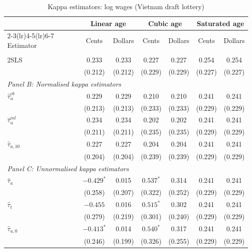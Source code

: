 \documentclass[12pt, a4paper, oneside]{article}
\theoremstyle{plain}
\theoremstyle{definition}
\begin{document}
\begin{table}[htbp]
\centering
\caption{Kappa estimators: log wages (Vietnam draft lottery)}
\label{tab:vietnam_kappa}
\small
\begin{tabular}{l cc cc cc}
\toprule
 & \multicolumn{2}{c}{Linear age}
 & \multicolumn{2}{c}{Cubic age}
 & \multicolumn{2}{c}{Saturated age} \\
\cmidrule(lr){2-3}\cmidrule(lr){4-5}\cmidrule(lr){6-7}
Estimator & Cents & Dollars & Cents & Dollars & Cents & Dollars \\
\midrule
\addlinespace[2pt]
\multicolumn{7}{l}{\textit{Panel A: 2SLS benchmark}} \\[2pt]
2SLS
  & 0.233      & 0.233
  & 0.227      & 0.227
  & 0.254      & 0.254      \\
  & (0.212)    & (0.212)
  & (0.229)    & (0.229)
  & (0.227)    & (0.227)    \\[4pt]
 
\multicolumn{7}{l}{\textit{Panel B: Normalised kappa estimators}} \\[2pt]
$\hat{\tau}_{u}^{cb}$
  & 0.229      & 0.229
  & 0.210      & 0.210
  & 0.241      & 0.241      \\
  & (0.213)    & (0.213)
  & (0.233)    & (0.233)
  & (0.229)    & (0.229)    \\[4pt]
$\hat{\tau}_{u}^{ml}$
  & 0.234      & 0.234
  & 0.202      & 0.202
  & 0.241      & 0.241      \\
  & (0.211)    & (0.211)
  & (0.235)    & (0.235)
  & (0.229)    & (0.229)    \\[4pt]
$\hat{\tau}_{a,10}$
  & 0.227      & 0.227
  & 0.204      & 0.204
  & 0.241      & 0.241      \\
  & (0.204)    & (0.204)
  & (0.239)    & (0.239)
  & (0.229)    & (0.229)    \\[4pt]
 
\multicolumn{7}{l}{\textit{Panel C: Unnormalised kappa estimators}} \\[2pt]
$\hat{\tau}_{a}$
  & $-0.429^{*}$  & 0.015
  & $0.537^{*}$   & 0.314
  & 0.241          & 0.241      \\
  & (0.258)        & (0.207)
  & (0.322)        & (0.252)
  & (0.229)        & (0.229)    \\[4pt]
$\hat{\tau}_{t}$
  & $-0.455$       & 0.016
  & $0.515^{*}$    & 0.302
  & 0.241          & 0.241      \\
  & (0.279)        & (0.219)
  & (0.301)        & (0.240)
  & (0.229)        & (0.229)    \\[4pt]
$\hat{\tau}_{a,0}$
  & $-0.413^{*}$   & 0.014
  & $0.540^{*}$    & 0.317
  & 0.241          & 0.241      \\
  & (0.246)        & (0.199)
  & (0.326)        & (0.255)
  & (0.229)        & (0.229)    \\
 

\end{tabular}
\end{table}
\end{document}

